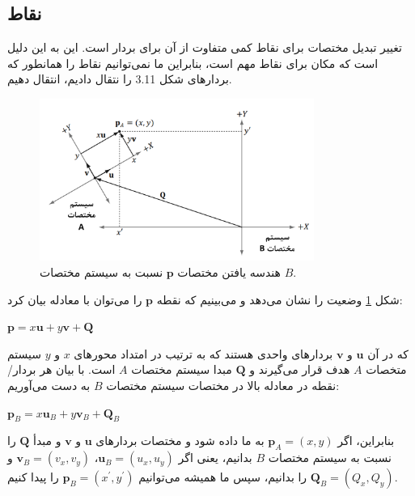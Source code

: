 \subsection{\textbf{نقاط}}
\label{subsec:3.4.2}
{
    \Large
    \begin{spacing}{1.5}
        تغییر تبدیل مختصات برای نقاط کمی متفاوت از آن برای بردار است.
        این به این دلیل است که مکان برای نقاط مهم است، بنابراین ما نمی‌توانیم نقاط را همانطور که بردارهای شکل 3.11 را نتقال دادیم، انتقال دهیم.

        \begin{figure}[H]
            \centering
            \setlength{\belowcaptionskip}{-10pt}
            \includegraphics[width=0.8\textwidth]{Images/4/3/4.Session.1.3.12}
            \caption {هندسه یافتن مختصات $\textbf{p}$ نسبت به سیستم مختصات $B$.}
            \label{fig:4.Session.1.3.12}
        \end{figure}

        شکل \ref{fig:4.Session.1.3.12} وضعیت را نشان می‌دهد و می‌بینیم که نقطه $\textbf{p}$ را می‌توان با معادله بیان کرد:

        \begin{center}
            $\textbf{p}=x\textbf{u}+y\textbf{v}+\textbf{Q}$
        \end{center}

        که در آن $\textbf{u}$ و $\textbf{v}$ بردارهای واحدی هستند که به ترتیب در امتداد محورهای $x$ و $y$ سیستم متخصات $A$ هدف قرار می‌گیرند و $\textbf{Q}$ مبدا سیستم مختصات $A$ است.
        با بیان هر بردار/نقطه در معادله بالا در مختصات سیستم مختصات $B$ به دست می‌آوریم:

        \begin{center}
            $\textbf{p}_{B}=x\textbf{u}_{B}+y\textbf{v}_{B}+\textbf{Q}_{B}$
        \end{center}

        بنابراین، اگر $\textbf{p}_{A}=(x, y)$ به ما داده شود و مختصات بردارهای $\textbf{u}$ و $\textbf{v}$ و مبدأ $\textbf{Q}$ را نسبت به سیستم مختصات $B$ بدانیم، یعنی اگر $\textbf{u}_{B}=(u_{x}, u_{y})$، $\textbf{v}_{B}=(v_{x}, v_{y})$ و $\textbf{Q}_{B}=(Q_{x}, Q_{y})$ را بدانیم، سپس ما همیشه می‌توانیم $\textbf{p}_{B}=(x^\prime, y^\prime)$ را پیدا کنیم.


\end{spacing}}
